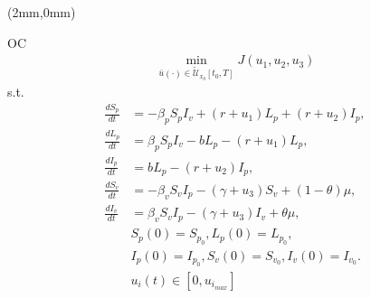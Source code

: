 	\begin{frame}[plain]
		\begin{textblock*}{120mm}(2mm,0mm)
			\begin{yellowbox}{OC}
				\begin{align*}
				\min_{\bar{u}(\cdot)\in \tilde{\mathcal{U}}_{x_0}[t_0,T]}J(u_1,u_2,u_3)
				\end{align*}
				s.t.
				\begin{equation*}
					\begin{aligned}
						\frac{dS_p}{dt} &=
						 -\beta_p S_p I_v +(r +u_1)L_p + (r + u_2) I_p,
						 \\
						\frac{dL_p}{dt} &=
						\beta_p S_p I_v -b L_p -(r + u_1)L_p,
						\\
						\frac{dI_p}{dt} &= 
						b L_p - (r + u_2) I_p,
						\\
						\frac{dS_v}{dt} &=
						-\beta_v S_v I_p - (\gamma+u_3) S_v +(1-\theta)\mu,
						\\
						\frac{dI_v}{dt} &=
						\beta_v S_v I_p -(\gamma+u_3) I_v +\theta\mu,
						\\
						&S_p(0) = S_{p_0}, L_p(0) = L_{p_0},
						\\
						&I_p(0) = I_{p_0},S_v(0) = S_{v_0}, I_v(0) = I_{v_0}.
						\\
						&u_i(t)\in[0,u_{i_{max}}]
						\end{aligned}%
				\end{equation*}
			\end{yellowbox}
		\end{textblock*}
	\end{frame}
